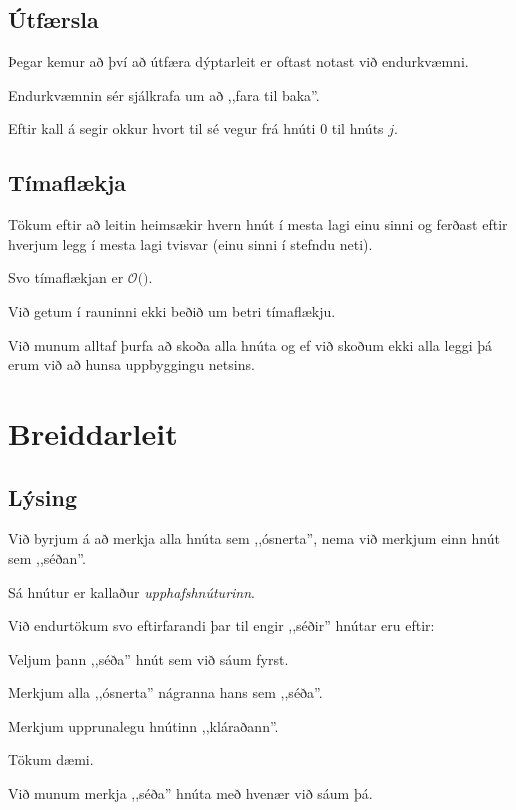 \subsection{Útfærsla}
{
	{
		\item<1-> Þegar kemur að því að útfæra dýptarleit er oftast notast við endurkvæmni.
		\item<2-> Endurkvæmnin sér sjálkrafa um að ,,fara til baka''.
		\item<3->[] 
		\item<4-> Eftir kall á  segir  okkur hvort til sé vegur frá hnúti $0$ til hnúts $j$.
	}
}

\subsection{Tímaflækja}
{
	{
		\item<1-> Tökum eftir að leitin heimsækir hvern hnút í mesta lagi einu sinni og
					ferðast eftir hverjum legg í mesta lagi tvisvar (einu sinni í stefndu neti).
		\item<2-> Svo tímaflækjan er $\mathcal{O}($\onslide<3->{$E + V$}$)$.
		\item<4-> Við getum í rauninni ekki beðið um betri tímaflækju.
		\item<5-> Við munum alltaf þurfa að skoða alla hnúta og ef við skoðum ekki alla leggi þá erum við að hunsa uppbyggingu netsins.
	}
}

\section{Breiddarleit}
\subsection{Lýsing}
{
	{
		\item<1-> Við byrjum á að merkja alla hnúta sem ,,ósnerta'', nema við merkjum einn hnút sem ,,séðan''.
		\item<2-> Sá hnútur er kallaður \emph{upphafshnúturinn}.
		\item<3-> Við endurtökum svo eftirfarandi þar til engir ,,séðir'' hnútar eru eftir:
		{
			\item<4-> Veljum þann ,,séða'' hnút sem við sáum fyrst.
			\item<5-> Merkjum alla ,,ósnerta'' nágranna hans sem ,,séða''.
			\item<6-> Merkjum upprunalegu hnútinn ,,kláraðann''.
		}
		\item<7-> Tökum dæmi.
		\item<8-> Við munum merkja ,,séða'' hnúta með hvenær við sáum þá.
	}
}


